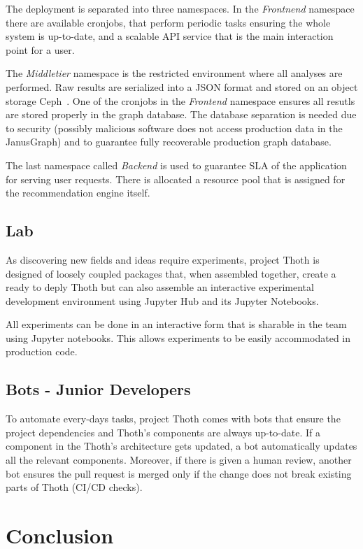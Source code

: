 \documentclass[a4paper]{llncs}
\begin{document}
The deployment is separated into three namespaces. In the \emph{Frontnend} namespace there are available cronjobs, that perform periodic tasks ensuring the whole system is up-to-date, and a scalable API service that is the main interaction point for a user.

The \emph{Middletier} namespace is the restricted environment where all analyses are performed. Raw results are serialized into a JSON format and stored on an object storage Ceph~\cite{ref_ceph}. One of the cronjobs in the \emph{Frontend} namespace ensures all resutls are stored properly in the graph database. The database separation is needed due to security (possibly malicious software does not access production data in the JanusGraph) and to guarantee fully recoverable production graph database.

The last namespace called \emph{Backend} is used to guarantee SLA of the application for serving user requests. There is allocated a resource pool that is assigned for the recommendation engine itself.

\subsection{Lab}

As discovering new fields and ideas require experiments, project Thoth is designed of loosely coupled packages that, when assembled together, create a ready to deply Thoth but can also assemble an interactive experimental development environment using Jupyter Hub and its Jupyter Notebooks.

All experiments can be done in an interactive form that is sharable in the team using Jupyter notebooks. This allows experiments to be easily accommodated in production code.

\subsection{Bots - Junior Developers}

To automate every-days tasks, project Thoth comes with bots that ensure the project dependencies and Thoth's components are always up-to-date. If a component in the Thoth's architecture gets updated, a bot automatically updates all the relevant components. Moreover, if there is given a human review, another bot ensures the pull request is merged only if the change does not break existing parts of Thoth (CI/CD checks).

\section{Conclusion}
\end{document}
